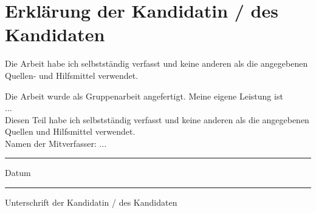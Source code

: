 \chapter{Erklärung der Kandidatin / des Kandidaten}

\begin{description}[$\Box$~]
\item[$\Box$] Die Arbeit habe ich selbstständig verfasst und keine anderen als die angegebenen Quellen- und Hilfsmittel verwendet.\\

\item[$\Box$] Die Arbeit wurde als Gruppenarbeit angefertigt. Meine eigene Leistung ist\\
...\\

Diesen Teil habe ich selbstständig verfasst und keine anderen als die angegebenen Quellen und Hilfsmittel verwendet. \\

Namen der Mitverfasser: ...

\end{description}

\vspace{2cm}

\begin{minipage}[t]{3cm}
\rule{4cm}{0.5pt}
Datum
\end{minipage}
\hfill
\begin{minipage}[t]{9cm}
\rule{9cm}{0.5pt}
Unterschrift der Kandidatin / des Kandidaten
\end{minipage}